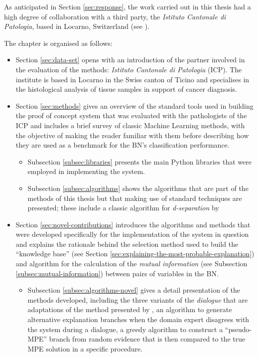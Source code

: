  As anticipated in Section \ref{sec:response}, the work carried out in this thesis had a high degree of collaboration with a third party, the \textit{Istituto Cantonale di Patologia}, based in Locarno, Switzerland (see \citet{istitutocantonalepresentazione}).

 The chapter is organised as follows:
 \begin{itemize}
  	\item Section \ref{sec:data-set} opens with an introduction of the partner involved in the evaluation of the methods: \textit{Istituto Cantonale di Patologia} (ICP). The institute is based in Locarno in the Swiss canton of Ticino and specialises in the histological analysis of tissue samples in support of cancer diagnosis.
 	\item Section \ref{sec:methods} gives an overview of the standard tools used in building the proof of concept system that was evaluated with the pathologists of the ICP and includes a brief survey of classic Machine Learning methods, with the objective of making the reader familiar with them before describing how they are used as a benchmark for the BN's classification performance.
 	\begin{itemize}
  		\item Subsection \ref{subsec:libraries} presents the main Python libraries that were employed in implementing the system.
  		\item Subsection \ref{subsec:algorithms} shows the algorithms that are part of the methods of this thesis but that making use of standard techniques are presented; these include a classic algorithm for \textit{d-separation} by \citet{koller2007}	
	\end{itemize}
	\item Section \ref{sec:novel-contributions} introduces the algorithms and methods that were developed specifically for the implementation of the system in question and explains the rationale behind the selection method used to build the \enquote{knowledge base} (see Section \ref{sec:explaining-the-most-probable-explanation}) and algorithm for the calculation of the \textit{mutual information} (see Subsection \ref{subsec:mutual-information}) between pairs of variables in the BN.
	\begin{itemize}
  		\item Subsection \ref{subsec:algorithms-novel} gives a detail presentation of the methods developed, including the three variants of the \textit{dialogue} that are adaptations of the method presented by \citet{Butz2018}, an algorithm to generate alternative explanation branches when the domain expert disagrees with the system during a dialogue, a greedy algorithm to construct a \enquote{pseudo-MPE} branch from random evidence that is then compared to the true MPE solution in a specific procedure.

\end{itemize}
\end{itemize}
